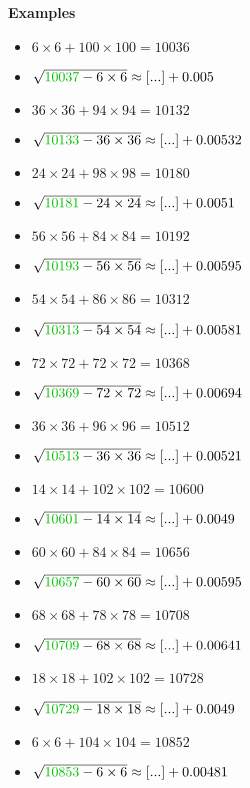 \documentclass[12pt]{article}
\begin{document}
\newpage

\textbf{Examples}
\begin{multicols}{2}
\begin{itemize}
\item $6\times6 + 100\times100 = 10036$
\item $\sqrt{ {\color{green!75!black}{10037}} - 6\times 6 } \approx [...] + 0.005$
\item $36\times36 + 94\times94 = 10132$
\item $\sqrt{ {\color{green!75!black}{10133}} - 36\times 36 } \approx [...] + 0.00532$
\item $24\times24 + 98\times98 = 10180$
\item $\sqrt{ {\color{green!75!black}{10181}} - 24\times 24 } \approx [...] + 0.0051$
\item $56\times56 + 84\times84 = 10192$
\item $\sqrt{ {\color{green!75!black}{10193}} - 56\times 56 } \approx [...] + 0.00595$
\item $54\times54 + 86\times86 = 10312$
\item $\sqrt{ {\color{green!75!black}{10313}} - 54\times 54 } \approx [...] + 0.00581$
\item $72\times72 + 72\times72 = 10368$
\item $\sqrt{ {\color{green!75!black}{10369}} - 72\times 72 } \approx [...] + 0.00694$
\item $36\times36 + 96\times96 = 10512$
\item $\sqrt{ {\color{green!75!black}{10513}} - 36\times 36 } \approx [...] + 0.00521$
\item $14\times14 + 102\times102 = 10600$
\item $\sqrt{ {\color{green!75!black}{10601}} - 14\times 14 } \approx [...] + 0.0049$
\item $60\times60 + 84\times84 = 10656$
\item $\sqrt{ {\color{green!75!black}{10657}} - 60\times 60 } \approx [...] + 0.00595$
\item $68\times68 + 78\times78 = 10708$
\item $\sqrt{ {\color{green!75!black}{10709}} - 68\times 68 } \approx [...] + 0.00641$
\item $18\times18 + 102\times102 = 10728$
\item $\sqrt{ {\color{green!75!black}{10729}} - 18\times 18 } \approx [...] + 0.0049$
\item $6\times6 + 104\times104 = 10852$
\item $\sqrt{ {\color{green!75!black}{10853}} - 6\times 6 } \approx [...] + 0.00481$

\end{itemize}
\end{multicols}
\end{document}
